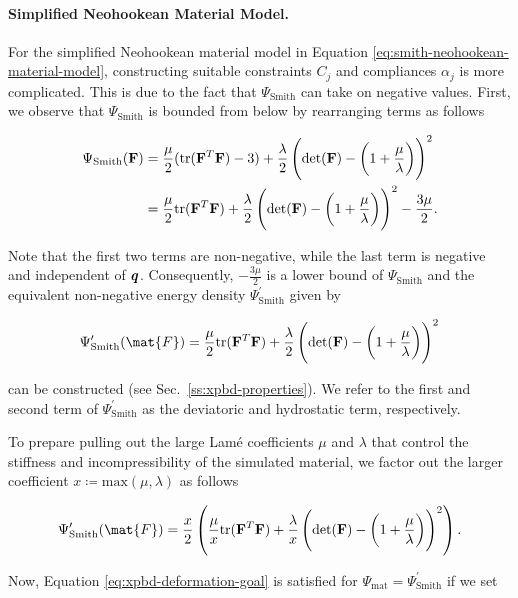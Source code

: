 \paragraph{Simplified Neohookean Material Model.}
For the simplified Neohookean material model in Equation \ref{eq:smith-neohookean-material-model}, constructing suitable constraints 
$C_j$ and compliances $\alpha_j$ is more complicated. This is due to the fact that $\Psi_{\text{Smith}}$ can take on 
negative values. First, we observe that $\Psi_{\text{Smith}}$ is bounded from below by rearranging terms as follows

\begin{align*}
    \Psi_{\text{Smith}}(\mathbf{F}) &= \frac{\mu}{2}(\text{tr}(\mathbf{F}^T\mathbf{F}) - 3) + \frac{\lambda}{2}\left(\text{det}(\mathbf{F}) - 
    \left(1 + \frac{\mu}{\lambda}\right)\right)^2\\
                                  &= \frac{\mu}{2}\text{tr}(\mathbf{F}^T\mathbf{F}) + \frac{\lambda}{2}\left(\text{det}(\mathbf{F}) - 
                                  \left(1 + \frac{\mu}{\lambda}\right)\right)^2 - \frac{3\mu}{2}.
\end{align*}

\noindent Note that the first two terms are non-negative, while the last term is negative and independent of 
$\bm{q}$. Consequently, $-\frac{3\mu}{2}$ is a lower bound of $\Psi_{\text{Smith}}$ and the equivalent 
non-negative energy density $\Psi^\prime_{\text{Smith}}$ given by

\[
    \Psi^\prime_{\text{Smith}}(\mat{F}) = \frac{\mu}{2}\text{tr}(\matm{F}^T\matm{F})     
    + \frac{\lambda}{2}\left(\text{det}(\matm{F}) - \left(1 + \frac{\mu}{\lambda}\right)\right)^2
\]

\noindent can be constructed (see Sec.\ \ref{ss:xpbd-properties}). We refer to the first and second term of 
$\Psi^\prime_{\text{Smith}}$ as the deviatoric and hydrostatic term, respectively.

To prepare pulling out the large Lamé coefficients $\mu$ and $\lambda$ that 
control the stiffness and incompressibility of the simulated material, we factor out the larger coefficient 
$x \coloneqq \text{max}(\mu, \lambda)$ as follows

\[
    \Psi^\prime_{\text{Smith}}(\mat{F}) = \frac{x}{2} \left(\frac{\mu}{x}\text{tr}(\matm{F}^T\matm{F})     
    + \frac{\lambda}{x}\left(\text{det}(\matm{F}) - \left(1 + \frac{\mu}{\lambda}\right)\right)^2\right).
\]

\noindent Now, Equation \ref{eq:xpbd-deformation-goal} is satisfied for $\Psi_{\text{mat}} = \Psi^\prime_{\text{Smith}}$ if 
we set

